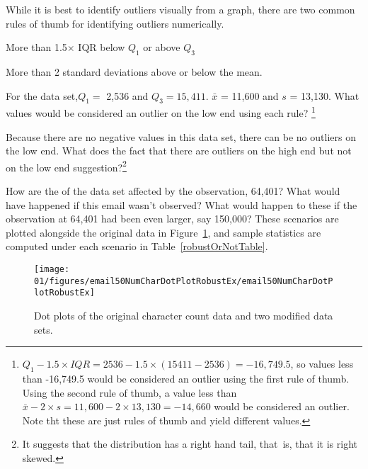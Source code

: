 While it is best to identify outliers visually from a graph, there are two common rules of thumb for identifying outliers numerically.


\begin{termBox}{
More than 1.5$\times$ IQR below $Q_1$ or above $Q_3$ 

More than 2 standard deviations above or below the mean.  }
\end{termBox}

\begin{exercise}For the  data set,$Q_1=$ 2,536 and $Q_3=15,411$.  $\bar{x}$ = 11,600  and $s$ = 13,130.  What values would be considered an outlier on the low end using each rule? \footnote{ $Q_1 - 1.5\times IQR = 2536 - 1.5 \times (15411 - 2536) = -16,749.5$, so values less than -16,749.5 would be considered an outlier using the first rule of thumb.  Using the second rule of thumb, a value less than $\bar{x} - 2\times s = 11,600 - 2 \times 13,130 = -14,660$ would be considered an outlier.  Note tht these are just rules of thumb and yield different values.}
\end{exercise}

\begin{exercise} Because there are no negative values in this data set, there can be no outliers on the low end.  What does the fact that there are outliers on the high end but not on the low end suggestion?\footnote{It suggests that the distribution has a right hand tail, that~is, that it is right skewed.  }
\end{exercise}

How are the  of the  data set affected by the observation, 64,401? What would have happened if this email wasn't observed? What would happen to these  if the observation at 64,401 had been even larger, say 150,000? These scenarios are plotted alongside the original data in Figure~\ref{email50NumCharDotPlotRobustEx}, and sample statistics are computed under each scenario in Table~\ref{robustOrNotTable}.


\begin{figure}[ht]
\centering
\texttt{[image: 01/figures/email50NumCharDotPlotRobustEx/email50NumCharDotPlotRobustEx]}
\caption{Dot plots of the original character count data and two modified data sets.}
\label{email50NumCharDotPlotRobustEx}
\end{figure}

